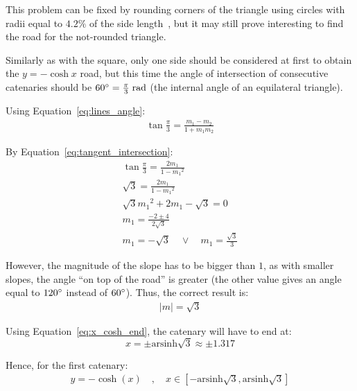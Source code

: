 \documentclass[12pt]{article}
\begin{document}
        This problem can be fixed by rounding corners of the triangle using circles with radii equal to $4.2\%$ of the side length~\cite{Hall_Wagon_1992,bridge_wolfram}, but it may still prove interesting to find the road for the not-rounded triangle.

        Similarly as with the square, only one side should be considered at first to obtain the $y= -\cosh x$ road, but this time the angle of intersection of consecutive catenaries should be $60\degree = \frac{\pi}{3} \;\text{rad}$ (the internal angle of an equilateral triangle).

        Using Equation~\ref{eq:lines_angle}:
        \begin{align}
            \tan \frac{\pi}{3} = \frac{m_1 - m_2}{1 + m_1 m_2}
        \end{align}

        By Equation~\ref{eq:tangent_intersection}:
        \begin{align}
            \tan \frac{\pi}{3} = \frac{2 m_1}{1 - {m_1}^2} \\
            \sqrt{3} = \frac{2 m_1}{1 - {m_1}^2} \\
            \sqrt{3} {m_1}^2 + 2 m_1 - \sqrt{3} = 0 \\
            m_1 = \frac{-2 \pm 4}{2 \sqrt{3}} \\
            m_1 = - \sqrt{3} \quad \lor \quad m_1 = \frac{\sqrt{3}}{3}
        \end{align}

        However, the magnitude of the slope has to be bigger than $1$, as with smaller slopes, the angle ``on top of the road'' is greater (the other value gives an angle equal to $120\degree$ instead of $60\degree$). Thus, the correct result is:
        \begin{align*}
            |m| = \sqrt{3}
        \end{align*}

        Using Equation~\ref{eq:x_cosh_end}, the catenary will have to end at:
        \begin{equation}
            x = \pm \text{arsinh}\sqrt{3} \approx \pm 1.317
        \end{equation}

        Hence, for the first catenary:
        \begin{align}
            y = -\cosh(x) \quad , \quad x \in [-\text{arsinh}\sqrt{3}, \text{arsinh}\sqrt{3}]
        \end{align}
\end{document}

